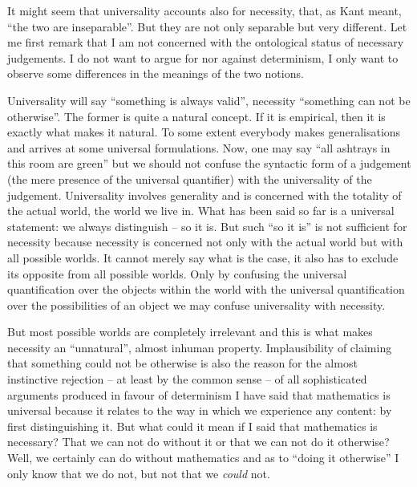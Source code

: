 It might seem that universality accounts also for necessity, that, as Kant meant, ``the two are inseparable''. But they are not only separable but very different. Let me first remark that I am not concerned with the ontological status of necessary judgements. I do not want to argue for nor against determinism, I only want to observe some differences in the meanings of the two notions.

Universality will say ``something is always valid'', necessity ``something can not be otherwise''. The former is quite a natural concept. If it is empirical, then it is exactly what makes it natural. To some extent everybody makes generalisations and arrives at some universal formulations. Now, one may say ``all ashtrays in this room are green'' but we should not confuse the syntactic form of a judgement (the mere presence of the universal quantifier) with the universality of the judgement. Universality involves generality and is concerned with the totality of the actual world, the world we live in. What has been said so far is a universal statement: we always distinguish -- so it is. But such ``so it is'' is not sufficient for necessity because necessity is concerned not only with the actual world but with all possible worlds. It cannot merely say what is the case, it also has to exclude its opposite from all possible worlds. Only by confusing the universal quantification over the objects within the world with the universal quantification over the possibilities of an object we may confuse universality with necessity. 

But most possible worlds are completely irrelevant and this is what makes necessity an ``unnatural'', almost inhuman property. Implausibility of claiming that something could not be otherwise is also the reason for the almost instinctive rejection -- at least by the common sense -- of all sophisticated arguments produced in favour of determinism I have said that mathematics is universal because it relates to the way in which we experience any content: by first distinguishing it. But what could it mean if I said that mathematics is necessary? That we can not do without it or that we can not do it otherwise? Well, we certainly can do without mathematics and as to ``doing it otherwise'' I only know that we do not, but not that we {\em could} not. 

